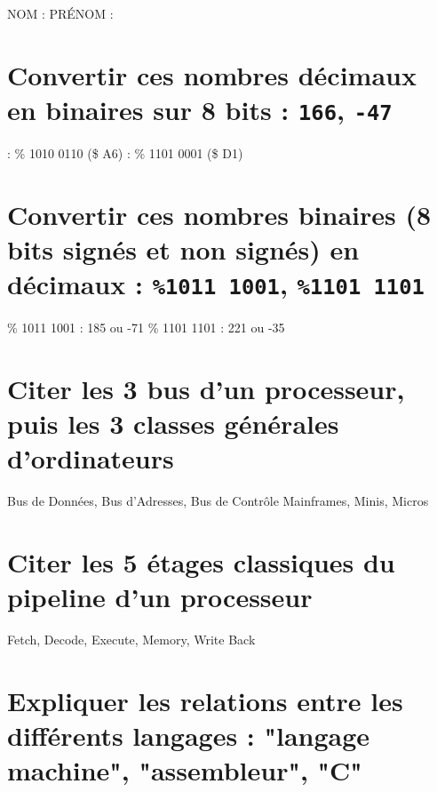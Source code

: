 \documentclass[11pt,a4paper]{article}
\author{Fabrice BOISSIER}
\begin{document}
\setlength{\fboxrule}{2pt}

\noindent {}

\bigskip

NOM : \hspace{6.5cm} PR\'ENOM :

\smallskip

\section{Convertir ces nombres décimaux en binaires sur 8 bits : \texttt{166}, \texttt{-47}}

 : \% 1010 0110 (\$ A6)	 : \% 1101 0001 (\$ D1)
\bigskip

\section{Convertir ces nombres binaires (8 bits signés et non signés) en décimaux : \texttt{\%1011 1001}, \texttt{\%1101 1101}}

\bigskip
\% 1011 1001 : 185 ou -71	\qquad	\% 1101 1101 : 221 ou -35
\bigskip

\section{Citer les 3 bus d'un processeur, puis les 3 classes générales d'ordinateurs}

\bigskip
Bus de Données, Bus d'Adresses, Bus de Contrôle \qquad Mainframes, Minis, Micros
\bigskip

\section{Citer les 5 étages classiques du pipeline d'un processeur}

\bigskip
Fetch, Decode, Execute, Memory, Write Back
\bigskip

\section{Expliquer les relations entre les différents langages : "langage machine", "assembleur", "C"}
\end{document}
